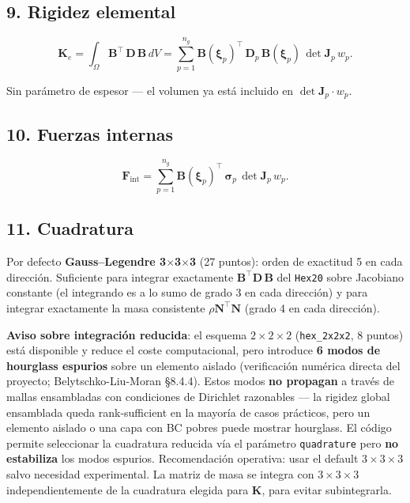 \documentclass[11pt,letterpaper,oneside]{report}
\begin{document}
\subsection{9. Rigidez elemental}

\[
\mathbf K_e = \int_\Omega \mathbf B^\top\,\mathbf D\,\mathbf B\, dV = \sum_{p=1}^{n_g} \mathbf B(\boldsymbol\xi_p)^\top\,\mathbf D_p\,\mathbf B(\boldsymbol\xi_p)\,\det\mathbf J_p\, w_p.
\]

Sin parámetro de espesor --- el volumen ya está incluido en $\det\mathbf J_p\cdot w_p$.

\subsection{10. Fuerzas internas}

\[
\mathbf F_{\text{int}} = \sum_{p=1}^{n_g} \mathbf B(\boldsymbol\xi_p)^\top\,\boldsymbol\sigma_p\,\det\mathbf J_p\, w_p.
\]

\subsection{11. Cuadratura}

Por defecto \textbf{Gauss--Legendre 3\ensuremath{\times}3\ensuremath{\times}3} (27 puntos): orden de exactitud 5 en cada dirección. Suficiente para integrar exactamente $\mathbf B^\top \mathbf D\, \mathbf B$ del \texttt{Hex20} sobre Jacobiano constante (el integrando es a lo sumo de grado 3 en cada dirección) y para integrar exactamente la masa consistente $\rho \mathbf N^\top \mathbf N$ (grado 4 en cada dirección).

\textbf{Aviso sobre integración reducida}: el esquema $2 \times 2 \times 2$ (\texttt{hex\_2x2x2}, 8 puntos) está disponible y reduce el coste computacional, pero introduce \textbf{6 modos de hourglass espurios} sobre un elemento aislado (verificación numérica directa del proyecto; Belytschko-Liu-Moran §8.4.4). Estos modos \textbf{no propagan} a través de mallas ensambladas con condiciones de Dirichlet razonables --- la rigidez global ensamblada queda rank-sufficient en la mayoría de casos prácticos, pero un elemento aislado o una capa con BC pobres puede mostrar hourglass. El código permite seleccionar la cuadratura reducida vía el parámetro \texttt{quadrature} pero \textbf{no estabiliza} los modos espurios. Recomendación operativa: usar el default $3 \times 3 \times 3$ salvo necesidad experimental. La matriz de masa se integra con $3 \times 3 \times 3$ independientemente de la cuadratura elegida para $\mathbf K$, para evitar subintegrarla.
\end{document}
